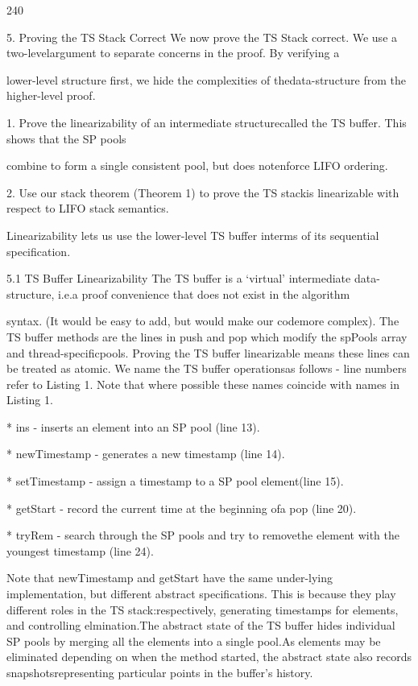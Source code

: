 240

5. Proving the TS Stack Correct
We now prove the TS Stack correct. We use a two-levelargument to separate concerns in the proof. By verifying a

lower-level structure first, we hide the complexities of thedata-structure from the higher-level proof.

1. Prove the linearizability of an intermediate structurecalled the TS buffer. This shows that the SP pools

combine to form a single consistent pool, but does notenforce LIFO ordering.

2. Use our stack theorem (Theorem 1) to prove the TS stackis linearizable with respect to LIFO stack semantics.

Linearizability lets us use the lower-level TS buffer interms of its sequential specification.

5.1 TS Buffer Linearizability
The TS buffer is a `virtual' intermediate data-structure, i.e.a proof convenience that does not exist in the algorithm

syntax. (It would be easy to add, but would make our codemore complex). The TS buffer methods are the lines in push
and pop which modify the spPools array and thread-specificpools. Proving the TS buffer linearizable means these lines
can be treated as atomic. We name the TS buffer operationsas follows - line numbers refer to Listing 1. Note that where
possible these names coincide with names in Listing 1.

* ins - inserts an element into an SP pool (line 13).

* newTimestamp - generates a new timestamp (line 14).

* setTimestamp - assign a timestamp to a SP pool element(line 15).

* getStart - record the current time at the beginning ofa pop (line 20).

* tryRem - search through the SP pools and try to removethe element with the youngest timestamp (line 24).

Note that newTimestamp and getStart have the same under-lying implementation, but different abstract specifications.
This is because they play different roles in the TS stack:respectively, generating timestamps for elements, and controlling elmination.The abstract state of the TS buffer hides individual
SP pools by merging all the elements into a single pool.As elements may be eliminated depending on when the
method started, the abstract state also records snapshotsrepresenting particular points in the buffer's history.

